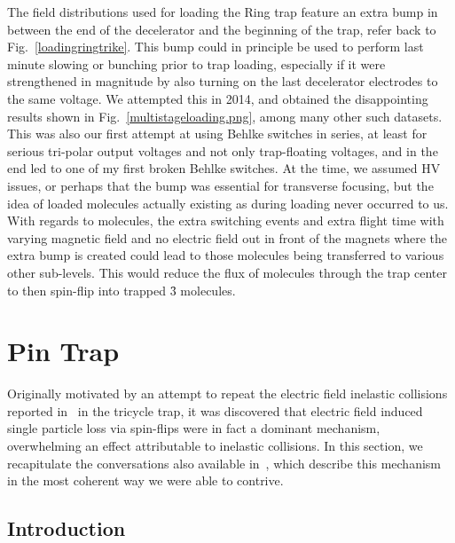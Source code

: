 The field distributions used for loading the Ring trap feature an extra bump in between the end of the decelerator and the beginning of the trap, refer back to Fig.~\ref{loadingringtrike}.
This bump could in principle be used to perform last minute slowing or bunching prior to trap loading, especially if it were strengthened in magnitude by also turning on the last decelerator electrodes to the same voltage.
We attempted this in 2014, and obtained the disappointing results shown in Fig.~\ref{multistageloading.png}, among many other such datasets.
This was also our first attempt at using Behlke switches in series, at least for serious tri-polar output voltages and not only trap-floating voltages, and in the end led to one of my first broken Behlke switches.
At the time, we assumed HV issues, or perhaps that the bump was essential for transverse focusing, but the idea of loaded molecules actually existing as  during loading never occurred to us.
With regards to  molecules, the extra switching events and extra flight time with varying magnetic field and no electric field out in front of the magnets where the extra bump is created could lead to those molecules being transferred to various other sub-levels.
This would reduce the flux of  molecules through the trap center to then spin-flip into trapped \f3 molecules.



\section{Pin Trap}
\label{sec:pintrap}

Originally motivated by an attempt to repeat the electric field inelastic collisions reported in~\cite{Stuhl2013} in the tricycle trap, it was discovered that electric field induced single particle loss via spin-flips were in fact a dominant mechanism, overwhelming an effect attributable to inelastic collisions.
In this section, we recapitulate the conversations also available in~\cite{Reens2017}, which describe this mechanism in the most coherent way we were able to contrive.

\subsection{Introduction}

